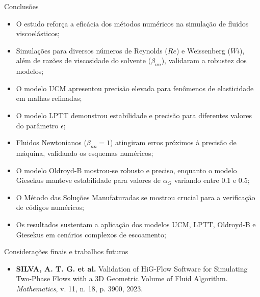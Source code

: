 \begin{frame}{Conclusões}
\begin{itemize}
    \item O estudo reforça a eficácia dos métodos numéricos na simulação de fluidos viscoelásticos;
    \item Simulações para diversos números de Reynolds ($Re$) e Weissenberg ($Wi$), além de razões de viscosidade do solvente ($\beta_{nn}$), validaram a robustez dos modelos;
    \item O modelo UCM apresentou precisão elevada para fenômenos de elasticidade em malhas refinadas;
    \item O modelo LPTT demonstrou estabilidade e precisão para diferentes valores do parâmetro $\epsilon$;
    \item Fluidos Newtonianos ($\beta_{nn}=1$) atingiram erros próximos à precisão de máquina, validando os esquemas numéricos;
    \item O modelo Oldroyd-B mostrou-se robusto e preciso, enquanto o modelo Giesekus manteve estabilidade para valores de $\alpha_G$ variando entre 0.1 e 0.5;
    \item O Método das Soluções Manufaturadas se mostrou crucial para a verificação de códigos numéricos;
    \item Os resultados sustentam a aplicação dos modelos UCM, LPTT, Oldroyd-B e Giesekus em cenários complexos de escoamento;
\end{itemize}
\end{frame}

\begin{frame}{Considerações finais e trabalhos futuros}
\begin{itemize}
    \item \textbf{SILVA, A. T. G. et al.} Validation of HiG-Flow Software for Simulating Two-Phase Flows with a 3D Geometric Volume of Fluid Algorithm. \textit{Mathematics}, v. 11, n. 18, p. 3900, 2023. 
\end{itemize}
\end{frame}